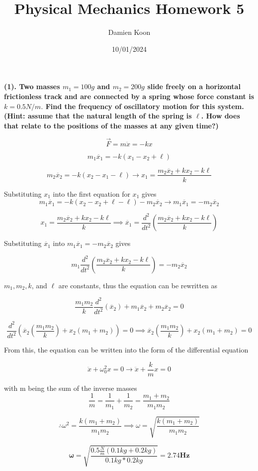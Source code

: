 \documentclass[12pt]{article}
\title{Physical Mechanics Homework 5}
\date{10/01/2024}
\author{Damien Koon}
\begin{document}
\maketitle

\newpage
\textbf{
(1). Two masses $m_1 = 100 g$ and $m_2 = 200 g$ slide freely on a horizontal frictionless track and are connected by a spring whose force constant is $k = 0.5 N/m.$ Find the frequency of oscillatory motion for this system. (Hint: assume that the natural length of the spring is $\ell$. How does that relate to the positions of the masses at any given time?)
}

$$\Vec{F} = m \ddot{x} = -kx$$

$$
m_1 \ddot{x_1} = -k ( x_1 - x_2 + \ell)
$$

$$
m_2 \ddot{x_2} = -k ( x_2 - x_1 - \ell) \rightarrow x_1 = \frac{m_2 \ddot{x_2} + k x_2 - k \ell}{k}
$$

Substituting $x_1$ into the first equation for $x_1$ gives
$$
m_1 \ddot{x_1} = -k(x_2 -x_2 + \ell - \ell) - m_2 \ddot{x_2} \rightarrow m_1 \ddot{x_1} = - m_2 \ddot{x_2}
$$

$$
x_1 = \frac{m_2 \ddot{x_2} + k x_2 - k \ell}{k} \implies \ddot{x_1} = \frac{d^2}{dt^2}(\frac{m_2 \ddot{x_2} + k x_2 - k \ell}{k})
$$

Substituting $\ddot{x_1}$ into $m_1 \ddot{x_1} = - m_2 \ddot{x_2}$ gives

$$
m_1 \frac{d^2}{dt^2}(\frac{m_2 \ddot{x_2} + k x_2 - k \ell}{k}) = - m_2 \ddot{x_2}
$$

$m_1,m_2, k$, and $\ell$ are constants, thus the equation can be rewritten as

$$
\frac{m_1 m_2}{k} \frac{d^2}{dt^2}(\ddot{x_2}) + m_1 \ddot{x_2} + m_2 \ddot{x_2} = 0
$$

$$
\frac{d^2}{dt^2}(\ddot{x_2}(\frac{m_1 m_2}{k}) + {x_2}(m_1 + m_2)) = 0 \implies \ddot{x_2}(\frac{m_1 m_2}{k}) + {x_2}(m_1 + m_2) = 0
$$

From this, the equation can be written into the form of the differential equation 

$$\ddot{x} + \omega_0^2 x = 0 \rightarrow \ddot{x} + \frac{k}{m} x = 0$$

with m being the sum of the inverse masses 
$$
\frac{1}{m} = \frac{1}{m_1} + \frac{1}{m_2} = \frac{m_1 + m_2}{m_1 m_2}
$$

$$
\therefore \omega^2 = \frac{k(m_1 + m_2)}{m_1 m_2} \implies \omega = \sqrt{\frac{k(m_1 + m_2)}{m_1 m_2}} 
$$

$$
\boldsymbol{\omega} = \sqrt{\frac{0.5 \frac{N}{m}(0.1 kg + 0.2 kg)}{0.1 kg * 0.2 kg}} = \boldsymbol{2.74 Hz}
$$
\end{document}
